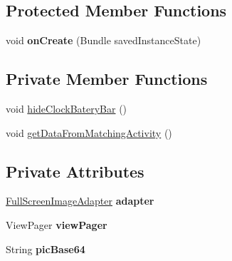 \subsection*{Protected Member Functions}
\begin{DoxyCompactItemize}
\item 
void {\bfseries on\+Create} (Bundle saved\+Instance\+State)\hypertarget{classcom_1_1example_1_1sebastian_1_1tindertp_1_1FullScreenViewActivity_af5c079a6d858da39f42f1cdcff02cf8a}{}\label{classcom_1_1example_1_1sebastian_1_1tindertp_1_1FullScreenViewActivity_af5c079a6d858da39f42f1cdcff02cf8a}

\end{DoxyCompactItemize}
\subsection*{Private Member Functions}
\begin{DoxyCompactItemize}
\item 
void \hyperlink{classcom_1_1example_1_1sebastian_1_1tindertp_1_1FullScreenViewActivity_a666951a13ab334846984245c0af2bc5d}{hide\+Clock\+Batery\+Bar} ()
\item 
void \hyperlink{classcom_1_1example_1_1sebastian_1_1tindertp_1_1FullScreenViewActivity_a0843ad0a4eb38e0597a3ca1a6b698f53}{get\+Data\+From\+Matching\+Activity} ()
\end{DoxyCompactItemize}
\subsection*{Private Attributes}
\begin{DoxyCompactItemize}
\item 
\hyperlink{classcom_1_1example_1_1sebastian_1_1tindertp_1_1animationTools_1_1FullScreenImageAdapter}{Full\+Screen\+Image\+Adapter} {\bfseries adapter}\hypertarget{classcom_1_1example_1_1sebastian_1_1tindertp_1_1FullScreenViewActivity_ae7992d6f86b15a17f89e1de86f702080}{}\label{classcom_1_1example_1_1sebastian_1_1tindertp_1_1FullScreenViewActivity_ae7992d6f86b15a17f89e1de86f702080}

\item 
View\+Pager {\bfseries view\+Pager}\hypertarget{classcom_1_1example_1_1sebastian_1_1tindertp_1_1FullScreenViewActivity_ab1e8b334abeec2dac68d75cae189a3c9}{}\label{classcom_1_1example_1_1sebastian_1_1tindertp_1_1FullScreenViewActivity_ab1e8b334abeec2dac68d75cae189a3c9}

\item 
String {\bfseries pic\+Base64}\hypertarget{classcom_1_1example_1_1sebastian_1_1tindertp_1_1FullScreenViewActivity_aa0062543ac550b0f05b31baced8dba91}{}\label{classcom_1_1example_1_1sebastian_1_1tindertp_1_1FullScreenViewActivity_aa0062543ac550b0f05b31baced8dba91}

\end{DoxyCompactItemize}


